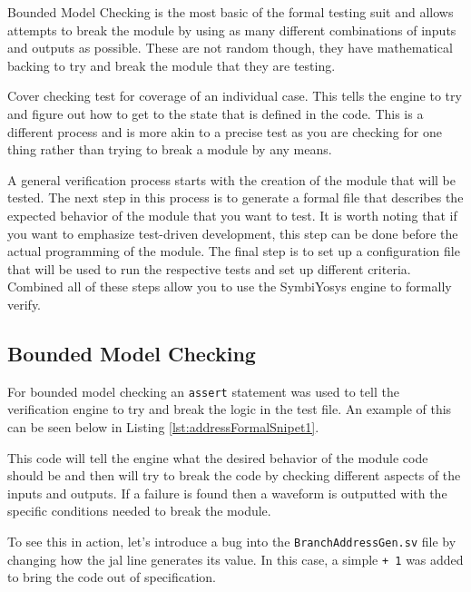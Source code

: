 \documentclass[
    a4paper, %
	12pt, %
    ]{CSSullivanBusinessReport}
\begin{document}
\begin{fullwidth}
Bounded Model Checking is the most basic of the formal testing suit and allows attempts to break the module by using as many different combinations of inputs and outputs as possible. These are not random though, they have mathematical backing to try and break the module that they are testing. 

Cover checking test for coverage of an individual case. This tells the engine to try and figure out how to get to the state that is defined in the code. This is a different process and is more akin to a precise test as you are checking for one thing rather than trying to break a module by any means. 

A general verification process starts with the creation of the module that will be tested. The next step in this process is to generate a formal file that describes the expected behavior of the module that you want to test. It is worth noting that if you want to emphasize test-driven development, this step can be done before the actual programming of the module. The final step is to set up a configuration file that will be used to run the respective tests and set up different criteria. Combined all of these steps allow you to use the SymbiYosys engine to formally verify.

\subsection{Bounded Model Checking} %

\captionsetup{style=widetable}
For bounded model checking an \verb|assert| statement was used to tell the verification engine to try and break the logic in the test file. An example of this can be seen below in Listing \ref{lst:addressFormalSnipet1}.




This code will tell the engine what the desired behavior of the module code should be and then will try to break the code by checking different aspects of the inputs and outputs. If a failure is found then a waveform is outputted with the specific conditions needed to break the module.

To see this in action, let's introduce a bug into the \verb|BranchAddressGen.sv| file by changing how the jal line generates its value. In this case, a simple \verb|+ 1| was added to bring the code out of specification.


\end{fullwidth}
\end{document}
